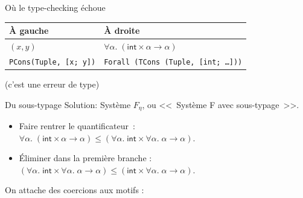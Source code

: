 \documentclass[final]{beamer}
\begin{document}
\begin{frame}{Où le type-checking échoue}

\begin{tabular}{l|l}
  À gauche & À droite\\
\hline
$(x, y)$ & $\forall \alpha.\; (\mathsf{int} \times \alpha \to \alpha)$ \\
\texttt{PCons(Tuple, [x; y])} &
\texttt{Forall (TCons (Tuple, [int; …]))}
\end{tabular}

\vspace{2ex}


\begin{flushright}
  (c'est une erreur de type)
\end{flushright}

\end{frame}


\begin{frame}{Du sous-typage}
  Solution: Système $F_\eta$, ou <<~Système F avec sous-typage~>>.

  \begin{itemize}
    \item Faire rentrer le quantificateur~:
      $\forall \alpha.\; (\mathsf{int}\times \alpha\to\alpha) \leq (\forall \alpha.\; \mathsf{int}\times \forall \alpha.\; \alpha\to\alpha)$.
    \item Éliminer dans la première branche :
      $(\forall \alpha.\; \mathsf{int}\times \forall \alpha.\; \alpha\to\alpha) \leq
      (\mathsf{int}\times \forall \alpha.\; \alpha\to\alpha)$.
  \end{itemize}

  On attache des coercions aux motifs :
  \begin{center}
  \end{center}
\end{frame}
\end{document}

